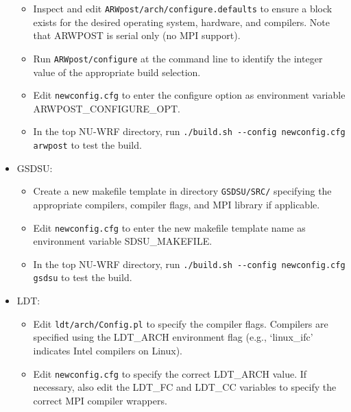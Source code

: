 \begin{itemize}
\begin{itemize}
  \item Inspect and edit \texttt{ARWpost/arch/configure.defaults} to ensure a 
    block exists for the desired operating system, hardware, and 
    compilers. Note that ARWPOST is serial only (no MPI support).

  \item Run \texttt{ARWpost/configure} at the command line to identify the 
    integer value of the appropriate build selection.

  \item Edit \texttt{newconfig.cfg} to enter the configure option as
    environment variable ARWPOST\_CONFIGURE\_OPT.

  \item In the top NU-WRF directory, run 
    \texttt{./build.sh -\--config \mbox{newconfig.cfg} arwpost} to test the 
    build.

  \end{itemize}

\item GSDSU:
  \begin{itemize}

  \item Create a new makefile template in directory \texttt{GSDSU/SRC/} 
    specifying the appropriate compilers, compiler flags, and MPI library 
    if applicable.

  \item Edit \texttt{newconfig.cfg} to enter the new makefile template
    name as environment variable SDSU\_MAKEFILE.

  \item In the top NU-WRF directory, run 
    \texttt{./build.sh -\--config \mbox{newconfig.cfg} gsdsu} to test the 
    build.

  \end{itemize}

\item LDT:
  \begin{itemize}

  \item Edit \texttt{ldt/arch/Config.pl} to specify the compiler flags. 
    Compilers are specified using the LDT\_ARCH environment flag (e.g.,
    `linux\_ifc' indicates Intel compilers on Linux).

  \item Edit \texttt{newconfig.cfg} to specify the correct LDT\_ARCH value.
    If necessary, also edit the LDT\_FC and LDT\_CC variables to specify the
    correct MPI compiler wrappers.


\end{itemize}
\end{itemize}
